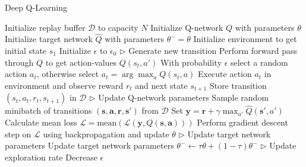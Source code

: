 \begin{algorithm}[h]
    \caption{Deep Q-Learning}
    \label{alg:dqn}
    \begin{algorithmic}
        \State Initialize replay buffer $\mathcal{D}$ to capacity $N$
        \State Initialize Q-network $Q$ with parameters $\theta$
        \State Initialize target network $\hat{Q}$ with parameters $\theta^-=\theta$
        \State Initialize environment to get initial state $s_1$
        \State Initialize $\epsilon$ to $\epsilon_0$
            \State $\triangleright$ Generate new transition
            \State Perform forward pass through $Q$ to get action-values $Q(s_t, a')$ 
            \State With probability $\epsilon$ select a random action $a_t$, otherwise select $a_t = \arg\!\max_a Q(s_t, a)$
            \State Execute action $a_t$ in environment and observe reward $r_t$ and next state $s_{t+1}$
            \State Store transition $(s_t, a_t, r_t, s_{t+1})$ in $\mathcal{D}$
            \State $\triangleright$ Update Q-network parameters
            \State Sample random minibatch of transitions $(\bm{s}, \bm{a}, \bm{r}, \bm{s'})$ from $\mathcal{D}$
            \State Set $\bm{y} = \bm{r} + \gamma \max_{a'} \hat{Q}(\bm{s'}, a')$
            \State Calculate mean loss $\mathcal{L} = \text{mean}(\mathcal{L}(\bm{y}, Q(\bm{s}, \bm{a})))$
            \State Perform gradient descent step on $\mathcal{L}$ using backpropagation and update $\theta$
            \State $\triangleright$ Update target network parameters
            \State Update target network parameters $\theta^- \gets \tau \theta + (1 - \tau) \theta^-$
            \State $\triangleright$ Update exploration rate
            \State Decrease $\epsilon$   
        \EndFor
    \end{algorithmic}
\end{algorithm}








